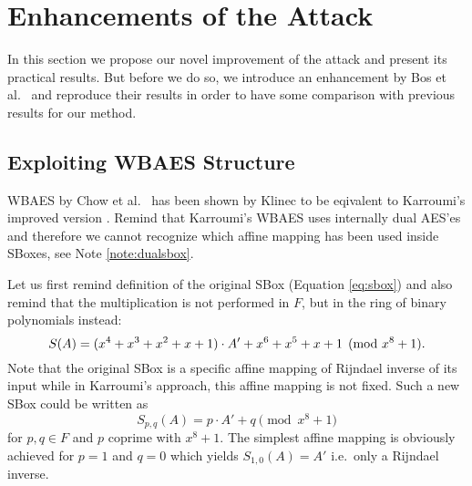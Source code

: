 \section{Enhancements of the Attack}   %
\label{sec:enhancements}

In this section we propose our novel improvement of the attack and present its practical results. But before we do so, we introduce an enhancement by Bos et al.\ \cite{bos2015differential} and reproduce their results in order to have some comparison with previous results for our method.



\subsection{Exploiting WBAES Structure}

WBAES by Chow et al.\ \cite{chow2002aes} has been shown by Klinec \cite{klinec2013white} to be eqivalent to Karroumi's improved version \cite{karroumi2011protecting}. Remind that Karroumi's WBAES uses internally dual AES'es and therefore we cannot recognize which affine mapping has been used inside SBoxes, see Note \ref{note:dualsbox}.

Let us first remind definition of the original SBox (Equation \ref{eq:sbox}) and also remind that the multiplication is not performed in $F$, but in the ring of binary polynomials instead:
\[
	S(A) = (x^4 + x^3 + x^2 + x + 1) \cdot A' + x^6 + x^5 + x + 1 \pmod{x^8+1} .
\]
Note that the original SBox is a specific affine mapping of Rijndael inverse of its input while in Karroumi's approach, this affine mapping is not fixed. Such a new SBox could be written as   %
\begin{equation}
\label{eq:spq}
	S_{p,q}(A) = p\cdot A' + q \pmod{x^8+1}
\end{equation}
for $p,q\in F$ and $p$ coprime with $x^8+1$. The simplest affine mapping is obviously achieved for $p=1$ and $q=0$ which yields $S_{1,0}(A) = A'$ i.e.\ only a Rijndael inverse.

